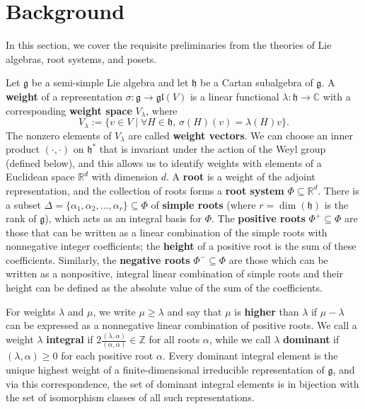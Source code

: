 \documentclass{amsart}
\theoremstyle{definition}
\newcommand{\defn}[1]{\textbf{#1}}
\begin{document}
\section{Background}\label{sec:background}

In this section, we cover the requisite preliminaries from the theories of Lie algebras, root systems, and posets.

 Let $\mathfrak{g}$ be a semi-simple Lie algebra and let $\mathfrak{h}$ be a Cartan subalgebra of $\mathfrak{g}$. A \defn{weight} of a representation $\sigma:\mathfrak{g}\rightarrow \mathfrak{gl}(V)$ is a linear functional $\lambda:\mathfrak{h}\rightarrow \mathbb{C}$ with a corresponding \defn{weight space} $V_\lambda$, where
$$V_\lambda:=\{v\in V\mid \forall H\in\mathfrak{h},\, \sigma(H)(v)=\lambda(H)v\}.$$ The nonzero elements of $V_\lambda$ are called \defn{weight vectors}. 
We can choose an inner product $(\cdot,\cdot)$ on $\mathfrak{h}^*$ that is invariant under the action of the Weyl group (defined below), and this allows us to identify weights with elements of a Euclidean space $\mathbb{R}^d$ with dimension $d$. 
A \textbf{root} is a weight of the adjoint representation, and the collection of roots forms a \textbf{root system} $\Phi\subseteq \mathbb{R}^d$. 
There is a subset $\Delta=\{\alpha_1,\alpha_2,\ldots,\alpha_r\} \subseteq \Phi$ of \textbf{simple roots} (where $r=\dim(\mathfrak{h})$ is the rank of $\mathfrak{g}$), which acts as an integral basis for $\Phi$.
The \defn{positive roots} $\Phi^+\subseteq \Phi$ are those that can be written as a linear combination of the simple roots with nonnegative integer coefficients; the \defn{height} of a positive root is the sum of these coefficients. Similarly, the \defn{negative roots} $\Phi^- \subseteq \Phi$ are those which can be written as a nonpositive, integral linear combination of simple roots and their height can be defined as the absolute value of the sum of the coefficients.

For weights $\lambda$ and $\mu$, we write $\mu\geq\lambda$ and say that $\mu$ is \defn{higher} than $\lambda$ if $\mu-\lambda$ can be expressed as a nonnegative linear combination of positive roots. We call a weight $\lambda$ \defn{integral} if $2\frac{(\lambda,\alpha)}{(\alpha,\alpha)}\in\mathbb{Z}$ for all roots $\alpha$, while we call $\lambda$ \defn{dominant} if $(\lambda,\alpha)\geq0$ for each positive root $\alpha$. Every dominant integral element is the unique highest weight of a finite-dimensional irreducible representation of $\mathfrak{g}$, and via this correspondence, the set of dominant integral elements is in bijection with the set of isomorphism classes of all such representations.
\end{document}

